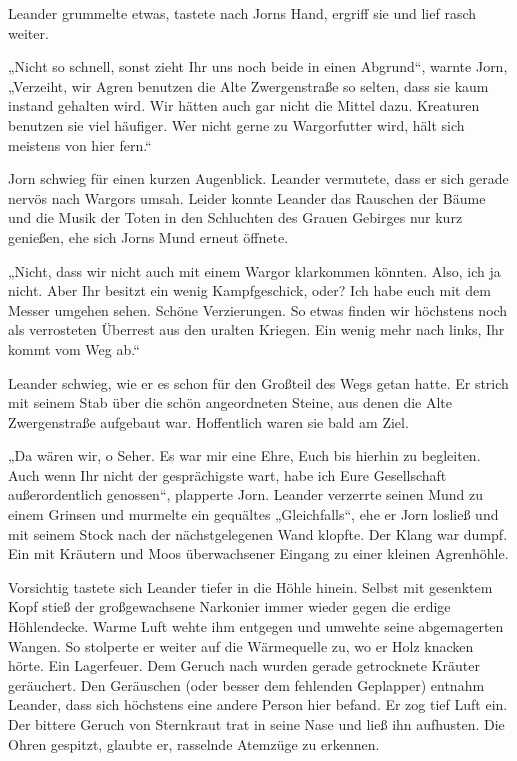 \documentclass[10pt, a4paper, oneside]{book}
\begin{document}
Leander grummelte etwas, tastete nach Jorns Hand, ergriff sie und lief rasch weiter.

„Nicht so schnell, sonst zieht Ihr uns noch beide in einen Abgrund“, warnte Jorn, „Verzeiht, wir Agren benutzen die Alte Zwergenstraße so selten, dass sie kaum instand gehalten wird. Wir hätten auch gar nicht die Mittel dazu. Kreaturen benutzen sie viel häufiger. Wer nicht gerne zu Wargorfutter wird, hält sich meistens von hier fern.“

Jorn schwieg für einen kurzen Augenblick. Leander vermutete, dass er sich gerade nervös nach Wargors umsah. Leider konnte Leander das Rauschen der Bäume und die Musik der Toten in den Schluchten des Grauen Gebirges nur kurz genießen, ehe sich Jorns Mund erneut öffnete.

„Nicht, dass wir nicht auch mit einem Wargor klarkommen könnten. Also, ich ja nicht. Aber Ihr besitzt ein wenig Kampfgeschick, oder? Ich habe euch mit dem Messer umgehen sehen. Schöne Verzierungen. So etwas finden wir höchstens noch als verrosteten Überrest aus den uralten Kriegen. Ein wenig mehr nach links, Ihr kommt vom Weg ab.“

Leander schwieg, wie er es schon für den Großteil des Wegs getan hatte. Er strich mit seinem Stab über die schön angeordneten Steine, aus denen die Alte Zwergenstraße aufgebaut war. Hoffentlich waren sie bald am Ziel.\bigskip







„Da wären wir, o Seher. Es war mir eine Ehre, Euch bis hierhin zu begleiten. Auch wenn Ihr nicht der gesprächigste wart, habe ich Eure Gesellschaft außerordentlich genossen“, plapperte Jorn. Leander verzerrte seinen Mund zu einem Grinsen und murmelte ein gequältes „Gleichfalls“, ehe er Jorn losließ und mit seinem Stock nach der nächstgelegenen Wand klopfte. Der Klang war dumpf. Ein mit Kräutern und Moos überwachsener Eingang zu einer kleinen Agrenhöhle.

Vorsichtig tastete sich Leander tiefer in die Höhle hinein. Selbst mit gesenktem Kopf stieß der großgewachsene Narkonier immer wieder gegen die erdige Höhlendecke. Warme Luft wehte ihm entgegen und umwehte seine abgemagerten Wangen. So stolperte er weiter auf die Wärmequelle zu, wo er Holz knacken hörte. Ein Lagerfeuer. Dem Geruch nach wurden gerade getrocknete Kräuter geräuchert. Den Geräuschen (oder besser dem fehlenden Geplapper) entnahm Leander, dass sich höchstens eine andere Person hier befand. Er zog tief Luft ein. Der bittere Geruch von Sternkraut trat in seine Nase und ließ ihn aufhusten. Die Ohren gespitzt, glaubte er, rasselnde Atemzüge zu erkennen.
\end{document}
